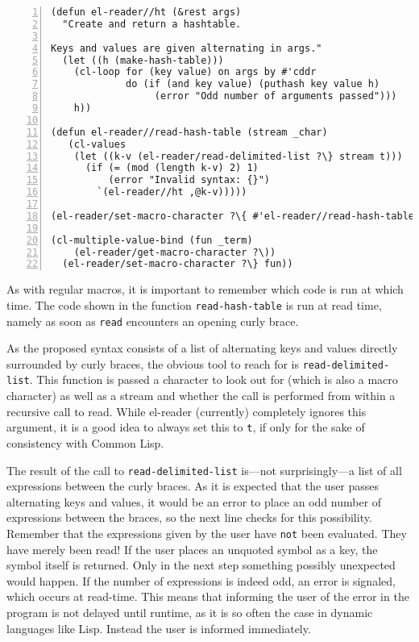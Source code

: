 \documentclass[a4paper,10pt,twoside]{report}
\newcommand{\cl}{Common Lisp}
\newcommand{\elr}{el-reader}
\newcommand{\sym}[1]{\texttt{#1}}
\newcommand{\fun}[1]{\texttt{#1}}
\newcommand{\Read}{\fun{read}}
\newcommand{\tee}{\sym{t}}
\begin{document}
\begin{lstlisting}[style=lispcode,label={code:hash-table},caption={Create syntax
    for hash-tables.},numbers=left]
(defun el-reader//ht (&rest args)
  "Create and return a hashtable.

Keys and values are given alternating in args."
  (let ((h (make-hash-table)))
    (cl-loop for (key value) on args by #'cddr
             do (if (and key value) (puthash key value h)
                  (error "Odd number of arguments passed")))
    h))

(defun el-reader//read-hash-table (stream _char)
   (cl-values
    (let ((k-v (el-reader/read-delimited-list ?\} stream t)))
      (if (= (mod (length k-v) 2) 1)
          (error "Invalid syntax: {}")
        `(el-reader//ht ,@k-v)))))

(el-reader/set-macro-character ?\{ #'el-reader//read-hash-table)

(cl-multiple-value-bind (fun _term)
    (el-reader/get-macro-character ?\))
  (el-reader/set-macro-character ?\} fun))
\end{lstlisting}

As with regular macros, it is important to remember which code is run at which
time.  The code shown in the function \fun{read-hash-table} is run at read time,
namely as soon as \Read{} encounters an opening curly brace.

As the proposed syntax consists of a list of alternating keys and values
directly surrounded by curly braces, the obvious tool to reach for is
\fun{read-delimited-list}.  This function is passed a character to look out for
(which is also a macro character) as well as a stream and whether the call is
performed from within a recursive call to read.  While \elr{} (currently)
completely ignores this argument, it is a good idea to always set this to
\tee{}, if only for the sake of consistency with \cl{}.

The result of the call to \fun{read-delimited-list} is---not surprisingly---a
list of all expressions between the curly braces.  As it is expected that the
user passes alternating keys and values, it would be an error to place an odd
number of expressions between the braces, so the next line checks for this
possibility.  Remember that the expressions given by the user have \texttt{not}
been evaluated.  They have merely been read!  If the user places an unquoted
symbol as a key, the symbol itself is returned.  Only in the next step something
possibly unexpected would happen.  If the number of expressions is indeed odd,
an error is signaled, which occurs at read-time.  This means that informing the
user of the error in the program is not delayed until runtime, as it is so often
the case in dynamic languages like Lisp.  Instead the user is informed
immediately.
\end{document}
